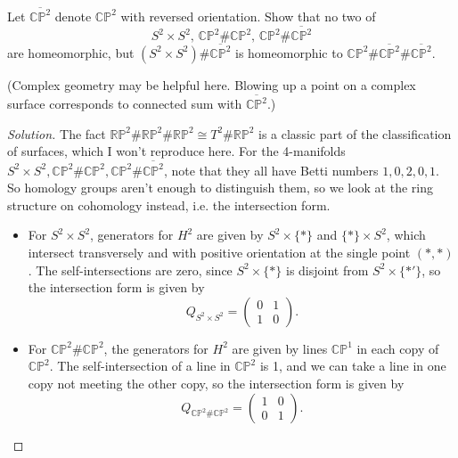 \documentclass{article}
\theoremstyle{definition}
\newcommand{\RP}{\mathbb{RP}}
\newcommand{\CP}{\mathbb{CP}}
\begin{document}
\begin{enumerate}
        Let $\overline{\CP^2}$ denote $\CP^2$ with reversed orientation. Show
        that no two of
        \begin{equation*}
            S^2\times S^2,\,\CP^2\#\CP^2,\,\CP^2\#\overline{\CP^2}
        \end{equation*}
        are homeomorphic, but $(S^2\times S^2)\#\overline{\CP^2}$ is
        homeomorphic to $\CP^2\#\overline{\CP^2}\#\overline{\CP^2}$.

        (Complex geometry may be helpful here. Blowing up a point on a complex
        surface corresponds to connected sum with $\overline{\CP^2}$.)

        \begin{proof}[Solution]
            The fact $\RP^2\#\RP^2\#\RP^2\cong T^2\#\RP^2$ is a classic part of
            the classification of surfaces, which I won't reproduce here. For
            the 4-manifolds
            $S^2\times S^2,\CP^2\#\CP^2,\CP^2\#\overline{\CP^2}$, note that they
            all have Betti numbers $1,0,2,0,1$. So homology groups aren't enough
            to distinguish them, so we look at the ring structure on cohomology
            instead, i.e. the intersection form.
            \begin{itemize}
                \item For $S^2\times S^2$, generators for $H^2$ are given by
                    $S^2\times\{*\}$ and $\{*\}\times S^2$, which intersect
                    transversely and with positive orientation at the single
                    point $(*,*)$. The self-intersections are zero, since
                    $S^2\times\{*\}$ is disjoint from $S^2\times\{*'\}$, so the
                    intersection form is given by
                    \begin{equation*}
                        Q_{S^2\times S^2} = \begin{pmatrix}
                            0 & 1 \\ 1 & 0
                        \end{pmatrix}.
                    \end{equation*}

                \item For $\CP^2\#\CP^2$, the generators for $H^2$ are given by
                    lines $\CP^1$ in each copy of $\CP^2$. The self-intersection
                    of a line in $\CP^2$ is 1, and we can take a line in one
                    copy not meeting the other copy, so the intersection form is
                    given by
                    \begin{equation*}
                        Q_{\CP^2\#\CP^2} = \begin{pmatrix}
                            1 & 0 \\ 0 & 1
                        \end{pmatrix}.
                    \end{equation*}


\end{itemize}
\end{proof}
\end{enumerate}
\end{document}

